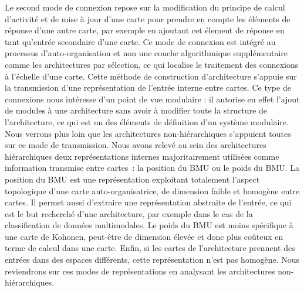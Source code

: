 \documentclass[../main]{subfiles}
\begin{document}
{Le second mode de connexion repose sur la modification du principe de calcul d'activité et de mise à jour d'une carte pour prendre en compte les éléments de réponse d'une autre carte, par exemple en ajoutant cet élement de réponse en tant qu'entrée secondaire d'une carte.
Ce mode de connexion est intégré au processus d'auto-organisation et non une couche algorithmique supplémentaire comme les architectures par sélection, ce qui localise le traitement des connexions à l'échelle d'une carte. 
Cette méthode de construction d'architecture s'appuie sur la transmission d'une représentation de l'entrée interne entre cartes.
Ce type de connexions nous intéresse d'un point de vue modulaire : il autorise en effet l'ajout de modules à une architecture sans avoir à modifier toute la structure de l'architecture, ce qui est un des éléments de définition d'un système modulaire.
Nous verrons plus loin que les architectures non-hiérarchiques s'appuient toutes sur ce mode de transmission.
Nous avons relevé au sein des architectures hiérarchiques deux représentations internes majoritairement utilisées comme information transmise entre cartes~: la position du BMU ou le poids du BMU. La position du BMU est une représentation exploitant totalement l'aspect topologique d'une carte auto-organisatrice, de dimension faible et homogène entre cartes. Il permet aussi d'extraire une représentation abstraite de l'entrée, ce qui est le but recherché d'une architecture, par exemple dans le cas de la classification de données multimodales.
Le poids du BMU est moins spécifique à une carte de Kohonen, peut-être de dimension élevée et donc plus coûteux en terme de calcul dans une carte. Enfin, si les cartes de l'architecture prennent des entrées dans des espaces différents, cette représentation n'est pas homogène. 
Nous reviendrons sur ces modes de représentations en analysant les architectures non-hiérarchiques.

}
\end{document}
